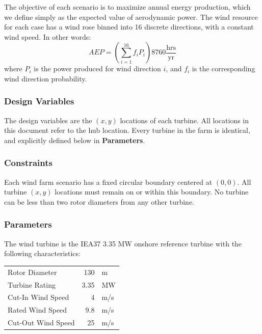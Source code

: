\documentclass[10pt]{article}
\begin{document}
        The objective of each scenario is to maximize annual energy production, which we define simply as the expected value of aerodynamic power.  The wind resource for each case has a wind rose binned into 16 discrete directions, with a constant wind speed.  In other words:
        \begin{equation*}
            AEP = \left(\sum_{i=1}^{16} f_i P_i\right) 8760 \frac{\textrm{hrs}}{\textrm{yr}}
        \end{equation*}
        where $P_i$ is the power produced for wind direction $i$, and $f_i$ is the corresponding wind direction probability.

    \subsubsection*{Design Variables}

        The design variables are the $(x, y)$ locations of each turbine.
        All locations in this document refer to the hub location.
        Every turbine in the farm is identical, and explicitly defined below in \textbf{Parameters}.

    \subsubsection*{Constraints}

        Each wind farm scenario has a fixed circular boundary centered at $(0, 0)$.  All turbine $(x, y)$ locations must remain on or within this boundary.  No turbine can be less than two rotor diameters from any other turbine.

    \subsubsection*{Parameters}

        The wind turbine is the IEA37 3.35 MW onshore reference turbine \cite{NREL335MW} with the following characteristics:
        \begin{center}
            \begin{tabular}{@{}lrl@{}}
            \toprule
                Rotor Diameter & 130 & m \\ 
                Turbine Rating & 3.35 & MW \\ 
                Cut-In Wind Speed & 4 & m/s \\ 
                Rated Wind Speed & 9.8 & m/s \\ 
                Cut-Out Wind Speed & 25 & m/s \\
            \bottomrule
            \end{tabular}
        \end{center}
\end{document}

